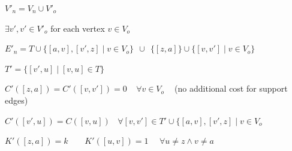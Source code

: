 \begin{DoxyItemize}
\item $ V'_n=V_n \cup V'_o $
\item $ \exists v',v'\in V'_o $ for each vertex $ v \in V_o $
\item $ E'_n=T \cup \lbrace [a,v],[v',z] \mid v \in V_o \rbrace \ \ \cup \ \ \lbrace [z,a] \rbrace \cup \lbrace [v,v']\mid v\in V_o \rbrace $
\item $ T' = \lbrace [v',u]\mid [v,u] \in T\rbrace $
\item $ C'([z,a])=C'([v,v']) = 0 \ \ \ \ \ \forall v \in V_o \ \ \ \ $ (no additional cost for support edges)
\item $ C'([v',u])=C([v,u]) \ \ \ \ \forall [v,v'] \in T' \cup \lbrace [a,v],[v',z]\mid v \in V_o $
\item $ K'([z,a])=k \ \ \ \ \ \ \ \ \ K'([u,v])=1 \ \ \ \ \ \ \forall u \neq z \wedge v \neq a $
\end{DoxyItemize}

